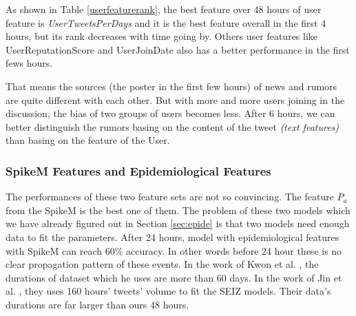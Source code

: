 As shown in Table \ref{userfeaturerank}, the best feature over 48 hours of user feature is \emph{UserTweetsPerDays} and it is the best feature overall in the first 4 hours, but its rank decreases with time going by. Others user features like UserReputationScore and UserJoinDate also has a better performance in the first fews hours. 

That means the sources (the poster in the first few hours) of news and rumors are quite different with each other. But with more and more users joining in the discussion, the bias of two groups of users becomes less. After 6 hours, we can better distinguish the rumors basing on the content of the tweet \emph{(text features)} than basing on the feature of the User.
 
\begin{table}[!h]
\centering
{}
\caption{Rank of Part of User Feature}
\label{userfeaturerank}
\end{table}
\subsubsection{SpikeM Features and Epidemiological Features}
The performances of these two feature sets are not so convincing. The feature $P_a$ from the SpikeM is the best one of them. 
The problem of these two models which we have already figured out in Section \ref{sec:epide} is that two models need enough data to fit the parameters. After 24 hours, model with epidemiological features with SpikeM can reach 60\% accuracy. In other words before 24 hour these is no clear propagation pattern of these events. In the work of Kwon et al. \cite{kwon2013prominent}, the durations of dataset which he uses are more than 60 days. In the work of Jin  et al. \cite{jin2013epidemiological}, they uses 160 hours' tweets' volume to fit the SEIZ models. Their data's durations are far larger than ours 48 hours.
 
